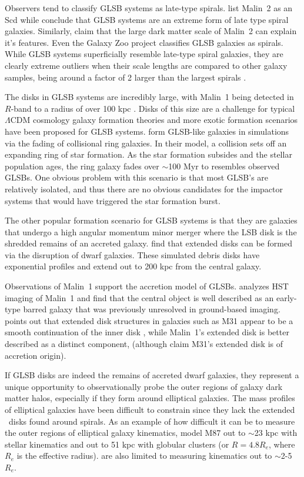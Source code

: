 \documentclass[12pt,preprint]{aastex}
\newcommand\HI{\ion{H}{1}}
\begin{document}
Observers tend to classify GLSB systems as late-type spirals.
\citet{Matthews01b} list Malin~2 as an Scd while \citet{Das13} conclude that GLSB systems are an extreme form of late type spiral galaxies.
Similarly, \citet{Kasparova14} claim that the large dark matter scale of Malin~2 can explain it's features.
Even the Galaxy Zoo project \citep{Willett13}  classifies GLSB galaxies as spirals.
While GLSB systems superficially resemble late-type spiral galaxies, they are clearly extreme outliers when their scale lengths are compared to other galaxy samples, being around a factor of 2 larger than the largest spirals \citep[Figure~4]{Dalcanton97}. 

The disks in GLSB systems are incredibly large, with Malin~1 being detected in $R$-band to a radius of over 100 kpc \citep{Moore06}.
Disks of this size are a challenge for typical $\Lambda$CDM cosmology galaxy formation theories and more exotic formation scenarios have been proposed for GLSB systems.
\citet{Mapelli08} form GLSB-like galaxies in simulations via the fading of collisional ring galaxies.
In their model, a collision sets off an expanding ring of star formation.
As the star formation subsides and the stellar population ages, the ring galaxy fades over $\sim$100 Myr to resembles observed GLSBs.
One obvious problem with this scenario is that most GLSB's are relatively isolated, and thus there are no obvious candidates for the impactor systems that would have triggered the star formation burst.


The other popular formation scenario for GLSB systems is that they are galaxies that undergo a high angular momentum minor merger where the LSB disk is the shredded remains of an accreted galaxy.
\citet{Pen06} find that extended disks can be formed via the disruption of dwarf galaxies.
These simulated debris disks have exponential profiles and extend out to 200 kpc from the central galaxy.

Observations of Malin~1 support the accretion model of GLSBs.
\citet{Barth07} analyzes HST imaging of Malin~1 and find that the central object is well described as an early-type barred galaxy that was previously unresolved in ground-based imaging. \citet{Barth07} points out that extended disk structures in galaxies such as M31 appear to be a smooth continuation of the inner disk \citep{Ferguson02}, while Malin~1's extended disk is better described as a distinct component, (although \citet{Ibata05} claim M31's extended disk is of accretion origin).


If GLSB disks are indeed the remains of accreted dwarf galaxies, they represent a unique opportunity to observationally probe the outer regions of galaxy dark matter halos, especially if they form around elliptical galaxies.
The mass profiles of elliptical galaxies have been difficult to constrain since they lack the extended \HI\ disks found around spirals.
As an example of how difficult it can be to measure the outer regions of elliptical galaxy kinematics, \citet{Murphy2011} model M87 out to $\sim$23 kpc with stellar kinematics and out to 51 kpc with globular clusters (or $R=4.8 R_e$, where $R_e$ is the effective radius). \citet{Raskutti14} are also limited to measuring kinematics out to $\sim$2-5 $R_e$.
\end{document}
